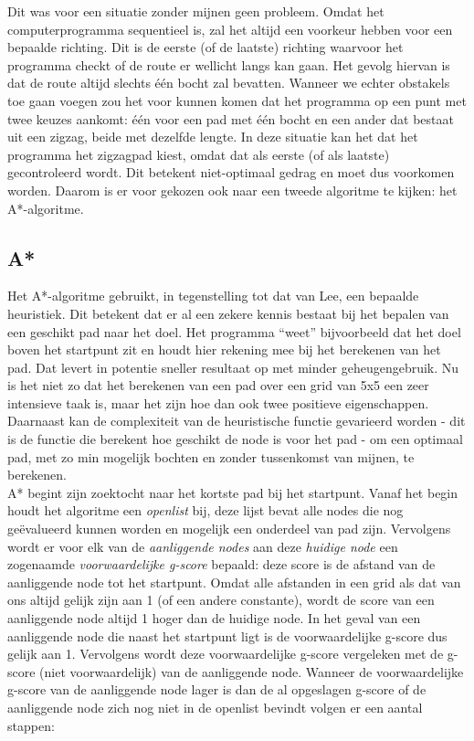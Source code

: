 \documentclass{report}
\begin{document}
Dit was voor een situatie zonder mijnen geen probleem.
Omdat het computerprogramma sequentieel is, zal het altijd een voorkeur hebben voor een bepaalde richting.
Dit is de eerste (of de laatste) richting waarvoor het programma checkt of de route er wellicht langs kan gaan.
Het gevolg hiervan is dat de route altijd slechts één bocht zal bevatten.
Wanneer we echter obstakels toe gaan voegen zou het voor kunnen komen dat het programma op een punt met twee keuzes aankomt: één voor een pad met één bocht en een ander dat bestaat uit een zigzag, beide met dezelfde lengte.
In deze situatie kan het dat het programma het zigzagpad kiest, omdat dat als eerste (of als laatste) gecontroleerd wordt.
Dit betekent niet-optimaal gedrag en moet dus voorkomen worden.
Daarom is er voor gekozen ook naar een tweede algoritme te kijken: het A*-algoritme.

\subsection{A*}
\label{ssec:astar}

Het A*-algoritme gebruikt, in tegenstelling tot dat van Lee, een bepaalde heuristiek.
Dit betekent dat er al een zekere kennis bestaat bij het bepalen
van een geschikt pad naar het doel.
Het programma ``weet'' bijvoorbeeld dat het doel boven het startpunt zit en houdt hier rekening mee bij het berekenen van het pad.
Dat levert in potentie sneller resultaat op met minder geheugengebruik.
Nu is het niet zo dat het berekenen van een pad over een grid van 5x5 een zeer intensieve taak is, maar het zijn hoe dan ook twee positieve eigenschappen.
Daarnaast kan de complexiteit van de heuristische functie gevarieerd worden - dit is de functie die berekent hoe geschikt de node is voor het pad - om een optimaal pad, met zo min mogelijk bochten en zonder tussenkomst van mijnen, te berekenen.\\

\noindent
A* begint zijn zoektocht naar het kortste pad bij het startpunt.
Vanaf het begin houdt het algoritme een \textit{openlist} bij, deze lijst bevat alle nodes die nog geëvalueerd kunnen worden en mogelijk een onderdeel van pad zijn.
Vervolgens wordt er voor elk van de \textit{aanliggende nodes} aan deze \textit{huidige node} een zogenaamde \textit{voorwaardelijke g-score} bepaald: deze score is de afstand van de aanliggende node tot het startpunt.
Omdat alle afstanden in een grid als dat van ons altijd gelijk zijn aan 1 (of een andere constante), wordt de score van een aanliggende node altijd 1 hoger dan de huidige node.
In het geval van een aanliggende node die naast het startpunt ligt is de voorwaardelijke g-score dus gelijk aan 1.
Vervolgens wordt deze voorwaardelijke g-score vergeleken met de g-score (niet voorwaardelijk) van de aanliggende node.
Wanneer de voorwaardelijke g-score van de aanliggende node lager is dan de al opgeslagen g-score of de aanliggende node zich nog niet in de openlist bevindt volgen er een aantal stappen:
\end{document}

